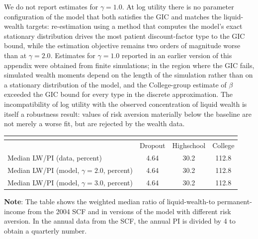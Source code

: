 \documentclass[\latexroot/\projectname]{subfiles}
\begin{document}
We do not report estimates for $\gamma=1.0$.
At log utility there is no parameter configuration of the model that both satisfies the GIC and matches the liquid-wealth targets: re-estimation using a method that computes the model's exact stationary distribution drives the most patient discount-factor type to the GIC bound, while the estimation objective remains two orders of magnitude worse than at $\gamma=2.0$.
Estimates for $\gamma=1.0$ reported in an earlier version of this appendix were obtained from finite simulations; in the region where the GIC fails, simulated wealth moments depend on the length of the simulation rather than on a stationary distribution of the model, and the College-group estimate of $\beta$ exceeded the GIC bound for every type in the discrete approximation.
The incompatibility of log utility with the observed concentration of liquid wealth is itself a robustness result: values of risk aversion materially below the baseline are not merely a worse fit, but are rejected by the wealth data.

\begin{center}
  \begin{tabular}{lccc}
    \multicolumn{4}{l}{}                                                           \\ \midrule
                                                  & Dropout & Highschool & College \\ \midrule
    Median LW/PI (data, percent)                  & 4.64    & 30.2       & 112.8   \\
    Median LW/PI (model, $\gamma = 2.0$, percent) & 4.64    & 30.2       & 112.8   \\
    Median LW/PI (model, $\gamma = 3.0$, percent) & 4.64    & 30.2       & 112.8   \\ \bottomrule
  \end{tabular}
  \label{tab:robustness_gamma_mlwpi}
  \parbox{15cm}{\small \vspace{.05cm} \textbf{Note}: The table shows the weighted median ratio of liquid-wealth-to permanent-income from the 2004 SCF and in versions of the model with different risk aversion.
    In the annual data from the SCF, the annual PI is divided by 4 to obtain a quarterly number.\normalsize}
\end{center}
\end{document}
